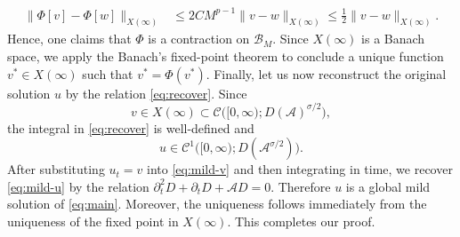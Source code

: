 \documentclass[a4paper,11pt]{article} %
\theoremstyle{remark}
\theoremstyle{definition}
\numberwithin{equation}{section}
\begin{document}
\begin{align*}
\big\|\Phi[v]-\Phi[w]\big\|_{X(\infty)}
&
\le
2CM^{p-1}
\|v-w\|_{X(\infty)} \le
\frac12
\|v-w\|_{X(\infty)}.
\end{align*}
Hence, one claims that \(\Phi\) is a contraction on
\(\mathcal{B}_M\). Since \(X(\infty)\) is a Banach space, we apply the Banach's fixed-point theorem to conclude a unique function $v^*\in X(\infty)$ such that $v^*=\Phi(v^*)$. Finally, let us now reconstruct the original solution \(u\) by the relation \eqref{eq:recover}. Since
\[
v\in X(\infty)
\subset
\mathcal{C}\Big([0,\infty);D(\mathcal{A})^{\sigma/2}\Big),
\]
the integral in \eqref{eq:recover} is well-defined and
\[
u\in
\mathcal{C}^1\Big([0,\infty);D(\mathcal{A}^{\sigma/2})\Big)
.
\]
After substituting \(u_t=v\) into \eqref{eq:mild-v} and then integrating in time, we recover \eqref{eq:mild-u} by the relation $\partial_t^2 D+\partial_t D+\mathcal{A}D=0$. Therefore \(u\) is a global mild solution of \eqref{eq:main}. Moreover, the uniqueness follows immediately from the uniqueness of the fixed point in \(X(\infty)\). This completes our proof.
\end{document}
